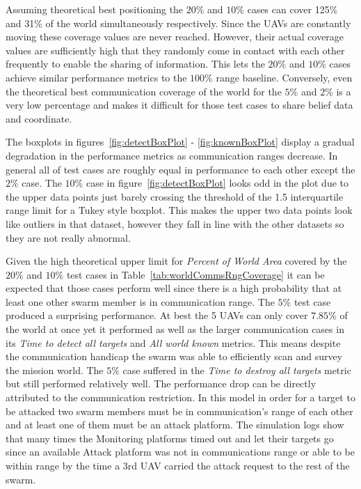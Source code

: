 \begin{multicols*}{2}
Assuming theoretical best positioning the $20\%$ and $10\%$ cases can cover 125\% and 31\% of the world simultaneously respectively. Since the UAVs are constantly moving these coverage values are never reached.  However, their actual coverage values are sufficiently high that they randomly come in contact with each other frequently to enable the sharing of information.  This lets the $20\%$ and $10\%$ cases achieve similar performance metrics to the $100\%$ range baseline.  Conversely, even the theoretical best communication coverage of the world for the $5\%$ and $2\%$ is a very low percentage and makes it difficult for those test cases to share belief data and coordinate.

The boxplots in figures~\ref{fig:detectBoxPlot} - \ref{fig:knownBoxPlot} display a gradual degradation in the performance metrics as communication ranges decrease.  In general all of test cases are roughly equal in performance to each other except the $2\%$ case.  The $10\%$ case in figure~\ref{fig:detectBoxPlot} looks odd in the plot due to the upper data points just barely crossing the threshold of the 1.5 interquartile range limit for a Tukey style boxplot.  This makes the upper two data points look like outliers in that dataset, however they fall in line  with the other datasets so they are not really abnormal. 

Given the high theoretical upper limit for \textit{Percent of World Area} covered by the $20\%$ and $10\%$ test cases in Table~\ref{tab:worldCommsRngCoverage} it can be expected that those cases perform well since there is a high probability that at least one other swarm member is in communication range.  The $5\%$ test case produced a surprising performance.  At best the 5 UAVs can only cover $7.85\%$ of the world at once yet it performed as well as the larger communication cases in its \textit{Time to detect all targets} and \textit{All world known} metrics.  This means despite the communication handicap the swarm was able to efficiently scan and survey the mission world.  The $5\%$ case suffered in the \textit{Time to destroy all targets} metric but still performed relatively well.  The performance drop can be directly attributed to the communication restriction.  In this model in order for a target to be attacked two swarm members must be in communication's range of each other and at least one of them must be an attack platform.  The simulation logs show that many times the Monitoring platforms timed out and let their targets go since an available Attack platform was not in communications range or able to be within range by the time a 3rd UAV carried the attack request to the rest of the swarm.


\end{multicols*}
